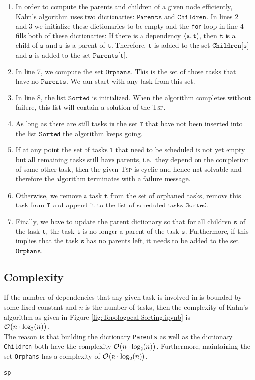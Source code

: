 \begin{enumerate}
\item In order to compute the parents and children of a given node efficiently, Kahn's algorithm
      uses two dictionaries: $\texttt{Parents}$ and $\texttt{Children}$.
      In lines 2 and 3 we initialize these dictionaries to be empty and the \texttt{for}-loop in line 4 fills both of these
      dictionaries: If there is a dependency $\pair(\texttt{s}, \texttt{t})$, then $\texttt{t}$ is a child of
      $\texttt{s}$ and $\texttt{s}$ is a parent of $\texttt{t}$.  Therefore, $\texttt{t}$ is added to the set
      $\texttt{Children[s]}$ and $\texttt{s}$ is added to the set $\texttt{Parents[t]}$.
\item In line 7, we compute the set $\texttt{Orphans}$.  This is the set of those tasks that have no
      $\texttt{Parents}$.  We can start with any task from this set.
\item In line 8, the list $\texttt{Sorted}$ is initialized.  When the algorithm completes without failure, this list will
      contain a solution of the \textsc{Tsp}.
\item As long as there are still tasks in the set $\texttt{T}$ that have not been inserted into the list
      $\texttt{Sorted}$ the algorithm keeps going.
\item If at any point the set of tasks $\texttt{T}$ that need to be scheduled is not yet empty but all remaining
      tasks still have parents, i.e.~they depend on the completion of some other task, then the given \textsc{Tsp}
      is cyclic and hence not solvable and therefore the algorithm terminates with a failure message.
\item Otherwise, we remove a task $\texttt{t}$ from the set of orphaned tasks, remove this task from $\texttt{T}$
      and append it to the list of scheduled tasks $\texttt{Sorted}$.
\item Finally, we have to update the parent dictionary so that for all children $\texttt{s}$ of the task
      $\texttt{t}$, the task $\texttt{t}$ is no longer a parent of the task $\texttt{s}$.  Furthermore, if this
      implies that the task $\texttt{s}$ has no parents left, it needs to be added to the set $\texttt{Orphans}$.
\end{enumerate}

\subsection{Complexity}
If the number of dependencies that any given task is involved in is bounded by some fixed constant and $n$ is
the number of tasks,  then the complexity of Kahn's algorithm as given in Figure \ref{fig:Topologocal-Sorting.ipynb}
is  
\\[0.2cm]
\hspace*{1.3cm}
$\mathcal{O}\bigl(n \cdot \log_2(n)\bigr)$.
\\[0.2cm]
The reason is that building the dictionary \texttt{Parents} as well as the dictionary \texttt{Children} both
have the complexity $\mathcal{O}\bigl(n \cdot \log_2(n)\bigr)$. Furthermore, maintaining  the set \texttt{Orphans} has a complexity of
$\mathcal{O}\bigl(n \cdot \log_2(n)\bigr)$.




\texttt{sp}